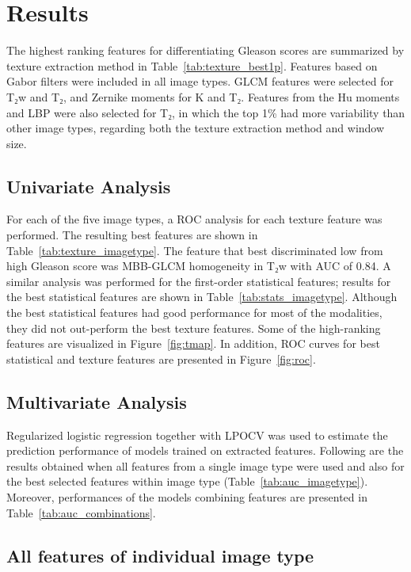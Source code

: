\section{Results}

The highest ranking features for differentiating Gleason scores are summarized
by texture extraction method in Table~\ref{tab:texture_best1p}. Features based
on Gabor filters were included in all image types. GLCM features were selected
for T₂w and T₂, and Zernike moments for K and T₂. Features from the Hu
moments and LBP were also selected for T₂, in which the top 1\% had more
variability than other image types, regarding both the texture extraction method
and window size.


\subsection{Univariate Analysis}

For each of the five image types, a ROC analysis for each texture feature was
performed. The resulting best features are shown in
Table~\ref{tab:texture_imagetype}. The feature that best discriminated low from
high Gleason score was MBB-GLCM homogeneity in T₂w with AUC of 0.84. A
similar analysis was performed for the first-order statistical features; results
for the best statistical features are shown in Table~\ref{tab:stats_imagetype}.
Although the best statistical features had good performance for most of the
modalities, they did not out-perform the best texture features. Some of the
high-ranking features are visualized in Figure~\ref{fig:tmap}. In addition, ROC
curves for best statistical and texture features are presented in
Figure~\ref{fig:roc}.


\subsection{Multivariate Analysis}

Regularized logistic regression together with LPOCV was used to estimate the
prediction performance of models trained on extracted features. Following are
the results obtained when all features from a single image type were used and
also for the best selected features within image type
(Table~\ref{tab:auc_imagetype}). Moreover, performances of the models combining
features are presented in Table~\ref{tab:auc_combinations}.


\subsection{All features of individual image type}

